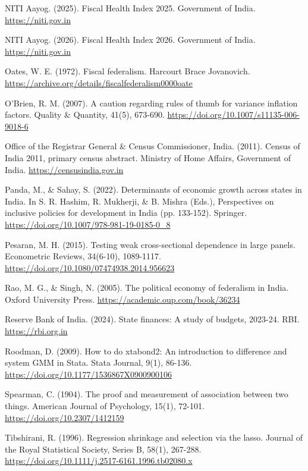 \documentclass[12pt,a4paper]{article}
\begin{document}
\hangindent=0.5in
NITI Aayog. (2025). Fiscal Health Index 2025. Government of India. \url{https://niti.gov.in}

\hangindent=0.5in
NITI Aayog. (2026). Fiscal Health Index 2026. Government of India. \url{https://niti.gov.in}

\hangindent=0.5in
Oates, W. E. (1972). Fiscal federalism. Harcourt Brace Jovanovich. \url{https://archive.org/details/fiscalfederalism0000oate}

\hangindent=0.5in
O'Brien, R. M. (2007). A caution regarding rules of thumb for variance inflation factors. Quality \& Quantity, 41(5), 673-690. \url{https://doi.org/10.1007/s11135-006-9018-6}

\hangindent=0.5in
Office of the Registrar General \& Census Commissioner, India. (2011). Census of India 2011, primary census abstract. Ministry of Home Affairs, Government of India. \url{https://censusindia.gov.in}

\hangindent=0.5in
Panda, M., \& Sahay, S. (2022). Determinants of economic growth across states in India. In S. R. Hashim, R. Mukherji, \& B. Mishra (Eds.), Perspectives on inclusive policies for development in India (pp. 133-152). Springer. \url{https://doi.org/10.1007/978-981-19-0185-0_8}

\hangindent=0.5in
Pesaran, M. H. (2015). Testing weak cross-sectional dependence in large panels. Econometric Reviews, 34(6-10), 1089-1117. \url{https://doi.org/10.1080/07474938.2014.956623}

\hangindent=0.5in
Rao, M. G., \& Singh, N. (2005). The political economy of federalism in India. Oxford University Press. \url{https://academic.oup.com/book/36234}

\hangindent=0.5in
Reserve Bank of India. (2024). State finances: A study of budgets, 2023-24. RBI. \url{https://rbi.org.in}

\hangindent=0.5in
Roodman, D. (2009). How to do xtabond2: An introduction to difference and system GMM in Stata. Stata Journal, 9(1), 86-136. \url{https://doi.org/10.1177/1536867X0900900106}

\hangindent=0.5in
Spearman, C. (1904). The proof and measurement of association between two things. American Journal of Psychology, 15(1), 72-101. \url{https://doi.org/10.2307/1412159}

\hangindent=0.5in
Tibshirani, R. (1996). Regression shrinkage and selection via the lasso. Journal of the Royal Statistical Society, Series B, 58(1), 267-288. \url{https://doi.org/10.1111/j.2517-6161.1996.tb02080.x}
\end{document}

